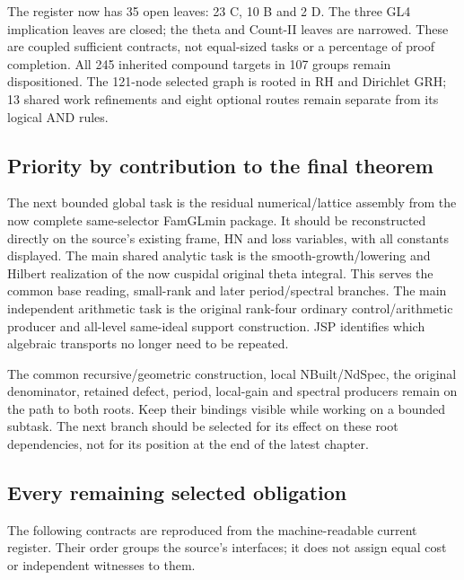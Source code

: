 The register now has 35 open leaves: 23 C, 10 B and 2 D.
The three GL4 implication leaves are closed; the theta and Count-II
leaves are narrowed. These are coupled sufficient contracts, not
equal-sized tasks or a percentage of proof completion. All 245
inherited compound targets in 107 groups remain dispositioned.
The 121-node selected graph is rooted in RH and Dirichlet GRH;
13 shared work refinements and eight optional routes remain
separate from its logical AND rules.

\subsection{Priority by contribution to the final theorem}

The next bounded global task is the residual numerical/lattice
assembly from the now complete same-selector FamGLmin package.
It should be reconstructed directly on the source's existing
frame, HN and loss variables, with all constants displayed.
The main shared analytic task is the smooth-growth/lowering and
Hilbert realization of the now cuspidal original theta integral.
This serves the common base reading, small-rank and later
period/spectral branches. The main independent arithmetic task
is the original rank-four ordinary control/arithmetic producer
and all-level same-ideal support construction. JSP identifies
which algebraic transports no longer need to be repeated.

The common recursive/geometric construction, local NBuilt/NdSpec,
the original denominator, retained defect, period, local-gain and
spectral producers remain on the path to both roots. Keep their
bindings visible while working on a bounded subtask. The next
branch should be selected for its effect on these root
dependencies, not for its position at the end of the latest chapter.

\subsection{Every remaining selected obligation}
The following contracts are reproduced from the machine-readable
current register. Their order groups the source's interfaces; it
does not assign equal cost or independent witnesses to them.

